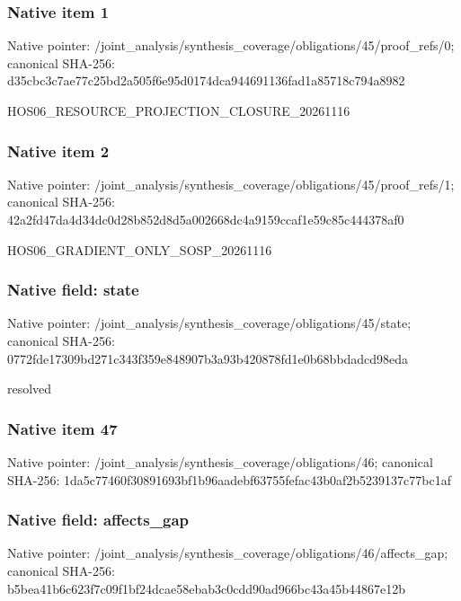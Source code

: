 \documentclass[10pt,a4paper]{article}
\begin{document}
\subsubsection{Native item 1}
Native pointer: /joint\_\allowbreak{}analysis/synthesis\_\allowbreak{}coverage/obligations/45/proof\_\allowbreak{}refs/0; canonical SHA-256: d35cbc3c7ae77c25bd2a505f6e95d0174dca944691136fad1a85718c794a8982

\begingroup\raggedright\sloppy HOS06\_\allowbreak{}RESOURCE\_\allowbreak{}PROJECTION\_\allowbreak{}CLOSURE\_\allowbreak{}20261116\par\endgroup

\subsubsection{Native item 2}
Native pointer: /joint\_\allowbreak{}analysis/synthesis\_\allowbreak{}coverage/obligations/45/proof\_\allowbreak{}refs/1; canonical SHA-256: 42a2fd47da4d34dc0d28b852d8d5a002668dc4a9159ccaf1e59c85c444378af0

\begingroup\raggedright\sloppy HOS06\_\allowbreak{}GRADIENT\_\allowbreak{}ONLY\_\allowbreak{}SOSP\_\allowbreak{}20261116\par\endgroup

\subsubsection{Native field: state}
Native pointer: /joint\_\allowbreak{}analysis/synthesis\_\allowbreak{}coverage/obligations/45/state; canonical SHA-256: 0772fde17309bd271c343f359e848907b3a93b420878fd1e0b68bbdadcd98eda

\begingroup\raggedright\sloppy resolved\par\endgroup

\subsubsection{Native item 47}
Native pointer: /joint\_\allowbreak{}analysis/synthesis\_\allowbreak{}coverage/obligations/46; canonical SHA-256: 1da5c77460f30891693bf1b96aadebf63755fefac43b0af2b5239137c77bc1af

\subsubsection{Native field: affects\_\allowbreak{}gap}
Native pointer: /joint\_\allowbreak{}analysis/synthesis\_\allowbreak{}coverage/obligations/46/affects\_\allowbreak{}gap; canonical SHA-256: b5bea41b6c623f7c09f1bf24dcae58ebab3c0cdd90ad966bc43a45b44867e12b
\end{document}
